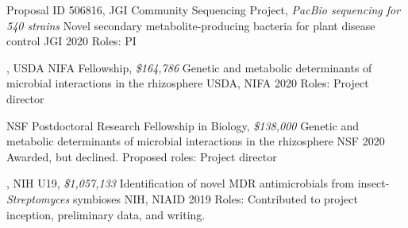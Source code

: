 

\begin{cventries}

\cventry
{Proposal ID 506816, JGI Community Sequencing Project, \textit{PacBio sequencing for 540 strains}}
{Novel secondary metabolite-producing bacteria for plant disease control}
{JGI}
{2020}
{Roles: PI}

\cventry
{\textbf{\textit{}}, USDA NIFA Fellowship, \textit{\$164,786}}
{Genetic and metabolic determinants of microbial interactions in the rhizosphere}
{USDA, NIFA}
{2020}
{Roles: Project director}

\cventry
{NSF Postdoctoral Research Fellowship in Biology, \textit{\$138,000}}
{Genetic and metabolic determinants of microbial interactions in the rhizosphere}
{NSF}
{2020}
{Awarded, but declined. Proposed roles: Project director}

\cventry
{\textbf{\textit{}}, NIH U19, \textit{\$1,057,133}}
{Identification of novel MDR antimicrobials from insect-\textit{Streptomyces} symbioses}
{NIH, NIAID}
{2019}
{Roles: Contributed to project inception, preliminary data, and writing.}

\end{cventries}